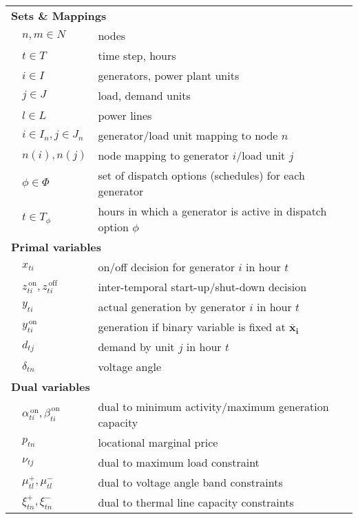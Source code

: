 \documentclass[9pt,a4paper]{article}
\newcommand{\fixedx}{\mathbf{\overline{x}_i}}
\newcommand{\on}{^{\,\text{on}}}
\newcommand{\off}{^{\,\text{off}}}
\begin{document}
\vfill
\newpage
\setcounter{table}{1}
\begin{table}
	\begin{center}
		\begin{small}
			\begin{tabular}{p{0.1 cm}p{1.9 cm}@{ ... }p{8.5 cm}}
				\hline
				\hline
				\multicolumn{3}{l}{\textbf{Sets \& Mappings}} \\
				&$n,m \in N$	& nodes \\
				&$t \in T$		& time step, hours \\
				&$i \in I$		& generators, power plant units \\
				&$j \in J$		& load, demand units \\
				&$l \in L$		& power lines \\
				&$i \in I_n, j \in J_n$ & generator/load unit mapping to node $n$ \\
				&$n(i), n(j)$ & node mapping to generator $i$/load unit $j$ \\
				&$\phi \in \Phi$	& set of dispatch options (schedules) for each generator \\
				&$t \in T_\phi$	& hours in which a generator is active in dispatch option $\phi$ \\
				\hline
				\multicolumn{3}{l}{\textbf{Primal variables}} \\
				&$x_{ti}$		& on/off decision for generator $i$ in hour $t$ \\
				&$z\on_{ti},z\off_{ti}$ & inter-temporal start-up/shut-down decision \\
				&$y_{ti}$		& actual generation by generator $i$ in hour $t$ \\
				&$y\on_{ti}$		& generation if binary variable is fixed at $\fixedx$ \\
				&$d_{tj}$		& demand by unit $j$ in hour $t$ \\
				&$\delta_{tn}$	& voltage angle \\
				\hline
				\multicolumn{3}{l}{\textbf{Dual variables}} \\
				&$\alpha\on_{ti},\beta\on_{ti}$	& dual to minimum activity/maximum generation capacity \\
				&$p_{tn}$		& locational marginal price \\
				&$\nu_{tj}$			& dual to maximum load constraint \\
				&$\mu^+_{tl},\mu^-_{tl}$ & dual to voltage angle band constraints \\
				&$\xi^+_{tn},\xi^-_{tn}$ & dual to thermal line capacity constraints \\

\end{tabular}
\end{small}
\end{center}
\end{table}
\end{document}
